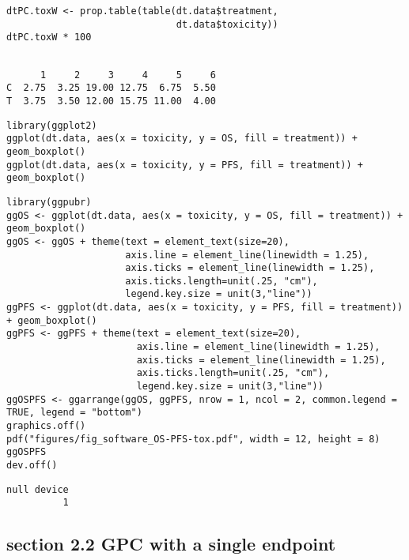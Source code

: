 \documentclass[12pt]{article}
\begin{document}
\lstset{language=r,label= ,caption= ,captionpos=b,numbers=none}
\begin{lstlisting}
dtPC.toxW <- prop.table(table(dt.data$treatment,
                              dt.data$toxicity))
dtPC.toxW * 100
\end{lstlisting}

\begin{verbatim}

      1     2     3     4     5     6
C  2.75  3.25 19.00 12.75  6.75  5.50
T  3.75  3.50 12.00 15.75 11.00  4.00
\end{verbatim}


\lstset{language=r,label= ,caption= ,captionpos=b,numbers=none}
\begin{lstlisting}
library(ggplot2)
ggplot(dt.data, aes(x = toxicity, y = OS, fill = treatment)) + geom_boxplot()
ggplot(dt.data, aes(x = toxicity, y = PFS, fill = treatment)) + geom_boxplot()
\end{lstlisting}

\lstset{language=r,label= ,caption= ,captionpos=b,numbers=none}
\begin{lstlisting}
library(ggpubr)
ggOS <- ggplot(dt.data, aes(x = toxicity, y = OS, fill = treatment)) + geom_boxplot()
ggOS <- ggOS + theme(text = element_text(size=20), 
                     axis.line = element_line(linewidth = 1.25),
                     axis.ticks = element_line(linewidth = 1.25),
                     axis.ticks.length=unit(.25, "cm"),
                     legend.key.size = unit(3,"line"))
ggPFS <- ggplot(dt.data, aes(x = toxicity, y = PFS, fill = treatment)) + geom_boxplot()
ggPFS <- ggPFS + theme(text = element_text(size=20), 
                       axis.line = element_line(linewidth = 1.25),
                       axis.ticks = element_line(linewidth = 1.25),
                       axis.ticks.length=unit(.25, "cm"),
                       legend.key.size = unit(3,"line"))
ggOSPFS <- ggarrange(ggOS, ggPFS, nrow = 1, ncol = 2, common.legend = TRUE, legend = "bottom")
graphics.off()
pdf("figures/fig_software_OS-PFS-tox.pdf", width = 12, height = 8)
ggOSPFS
dev.off()
\end{lstlisting}

\begin{verbatim}
null device 
          1
\end{verbatim}
\subsection{section 2.2 GPC with a single endpoint}
\label{sec:orga66b398}
\end{document}
